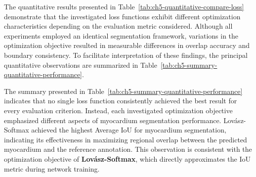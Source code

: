 The quantitative results presented in Table~\ref{tab:ch5-quantitative-compare-loss} demonstrate that the investigated loss functions exhibit different optimization characteristics depending on the evaluation metric considered. Although all experiments employed an identical segmentation framework, variations in the optimization objective resulted in measurable differences in overlap accuracy and boundary consistency. To facilitate interpretation of these findings, the principal quantitative observations are summarized in Table~\ref{tab:ch5-summary-quantitative-performance}.

\begin{table}[htbp]
	\centering
	\caption{Summary of Quantitative Performance based on Table~\ref{tab:ch5-quantitative-compare-loss}}
	\label{tab:ch5-summary-quantitative-performance}
	
	\small
	\setlength{\heavyrulewidth}{\lightrulewidth}
	\renewcommand{\arraystretch}{1.3}
	
\end{table}

The summary presented in Table~\ref{tab:ch5-summary-quantitative-performance} indicates that no single loss function consistently achieved the best result for every evaluation criterion. Instead, each investigated optimization objective emphasized different aspects of myocardium segmentation performance. Lovász-Softmax achieved the highest Average IoU for myocardium segmentation, indicating its effectiveness in maximizing regional overlap between the predicted myocardium and the reference annotation. This observation is consistent with the optimization objective of \textbf{Lovász-Softmax}, which directly approximates the IoU metric during network training.

